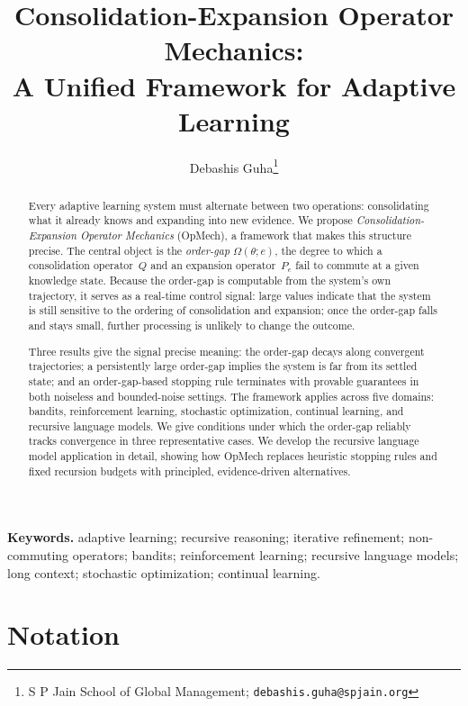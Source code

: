 \documentclass[12pt,a4paper]{article}
\title{Consolidation-Expansion Operator Mechanics:\\
A Unified Framework for Adaptive Learning}
\author{
    Debashis Guha\thanks{S P Jain School of Global Management;
    \texttt{debashis.guha@spjain.org}}
}
\date{}
\newcommand{\Ogap}{\Omega}
\begin{document}
\maketitle

\begin{abstract}
Every adaptive learning system must alternate between two operations:
consolidating what it already knows and expanding into new evidence. We propose
\emph{Consolidation-Expansion Operator Mechanics} (OpMech), a framework that
makes this structure precise. The central object is the \emph{order-gap}
$\Ogap(\theta; e)$, the degree to which a consolidation operator~$Q$ and an
expansion operator~$P_e$ fail to commute at a given knowledge state. Because
the order-gap is computable from the system's own trajectory, it serves as
a real-time control signal: large values indicate that the system is still
sensitive to the ordering of consolidation and expansion; once the order-gap
falls and stays small, further processing is unlikely to change the outcome.

Three results give the signal precise meaning: the order-gap
decays along convergent trajectories; a persistently large order-gap implies
the system is far from its settled state; and an order-gap-based
stopping rule terminates with provable guarantees in both noiseless and
bounded-noise settings. The framework applies across five domains:
bandits, reinforcement learning, stochastic optimization, continual learning,
and recursive language models. We give
conditions under which the order-gap reliably tracks convergence in three
representative cases. We develop the recursive language model application in
detail, showing how OpMech replaces heuristic stopping rules and fixed recursion
budgets with principled, evidence-driven alternatives.
\end{abstract}

\noindent\textbf{Keywords.}
adaptive learning; recursive reasoning; iterative refinement; non-commuting operators; 
bandits; reinforcement learning; recursive language models; long context; 
stochastic optimization; continual learning.

\setcounter{tocdepth}{2}
\tableofcontents
\medskip

\section*{Notation}
\label{sec:notation}
\end{document}
